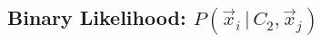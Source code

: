 \documentclass[usenatbib]{mnras}
\newcommand{\given}{\,|\,}
\newcommand{\dd}{\mathrm{d}}
\newcommand{\degree}{\ifmmode {^\circ}\else$^\circ$\ \fi}
\begin{document}
\begin{comment}
These terms can be separated so long as no correlation exists between them. There is likely to be some dependence between these terms; for instance at larger distances, farther from the Galactic plane, stars are more likely to be halo members with larger peculiar velocities. A more complex model could account for this, however here we consider such variations to have only a minor effect on the probability in Equation \ref{eq:P_obs_noise}. 

We can determine the three probabilities in Equation \ref{eq:P_obs_noise_split} empirically using the following procedure. First, we select an arbitrarily large radius around each star to search for matching pairs. We then numerically generate three normalized histograms, one for each observable: $\theta$, $\Delta V_{\rm pec}$, and $\Delta D'$. Interpolating along the histograms, for each observable, for each pair, provides the three probabilities in Equation \ref{eq:P_obs_noise_split}. What remains is to determine a large enough search radius, such that there are enough that even widely separated, genuine stellar pairs can be resolved and that there are enough stellar pairs such that the three histograms do not suffer from low number statistics. For separations too large, our assumption of independence in observables breaks down, and the split we made in Equation \ref{eq:P_obs_noise} is no longer justified. This search radius needs to be calibrated, but for now, we suggest that 1\degree should be sufficient.

Combining Equation \ref{eq:P_obs_noise_split} and \ref{eq:P_noise_marginalized} gives us the following:
\begin{eqnarray}
P(\vec{x}_i \given C_1, \vec{x}_j) &=& P(\theta \given \alpha, \delta)\ 
   P(\Delta V_{\rm pec} \given \alpha, \delta, \mu_{\alpha} \mu_{\delta})\ 
   \left| \frac{\dd \Delta V_{\rm pec}}{\dd \Delta \mu} \right| \nonumber \\
   & & \qquad \times  \int \dd \Delta D'\ P(\Delta D \given \Delta D')\ P(\Delta D' \given \alpha, \delta, D),
\end{eqnarray}
where we were able to move the conditional probabilities for $\theta$ and $\Delta V_{\rm pec}$ outside the integral over $\Delta D'$ because of their independence on distance.
\end{comment}




\subsection{Binary Likelihood: $P(\vec{x}_i \given C_2, \vec{x}_j)$}
\end{document}
